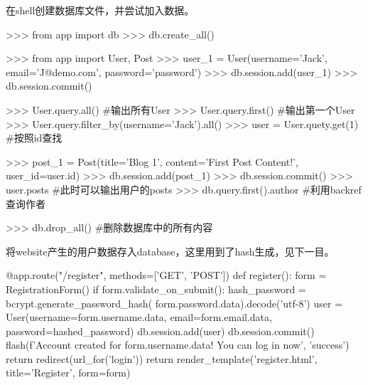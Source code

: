       在shell创建数据库文件，并尝试加入数据。
      \begin{codeblock}[language=python, caption={create database file in terminal}]
        >>> from app import db
        >>> db.create_all()

        >>> from app import User, Post
        >>> user_1 = User(username='Jack', email='J@demo.com', password='password')
        >>> db.session.add(user_1)
        >>> db.session.commit()

        >>> User.query.all() #输出所有User
        >>> User.query.first() #输出第一个User
        >>> User.query.filter_by(username='Jack').all()
        >>> user = User.quety.get(1) #按照id查找

        >>> post_1 = Post(title='Blog 1', content='First Post Content!', user_id=user.id)
        >>> db.session.add(post_1)
        >>> db.session.commit()
        >>> user.posts #此时可以输出用户的posts
        >>> db.query.first().author #利用backref查询作者

        >>> db.drop_all() #删除数据库中的所有内容
      \end{codeblock}

      将website产生的用户数据存入database，这里用到了hash生成，见下一目。
      \begin{codeblock}
        @app.route("/register", methods=['GET', 'POST']) 
        def register():
            form = RegistrationForm()
            if form.validate_on_submit(): 
                hash_password = bcrypt.generate_password_hash(
                    form.password.data).decode('utf-8')
                user = User(username=form.username.data, 
                            email=form.email.data, 
                            password=hashed_password)
                db.session.add(user)
                db.session.commit()
                flash(f'Account created for {form.username.data}! You can log in now', 
                    'success') 
                return redirect(url_for('login'))
            return render_template('register.html', title='Register', form=form)
      \end{codeblock}

